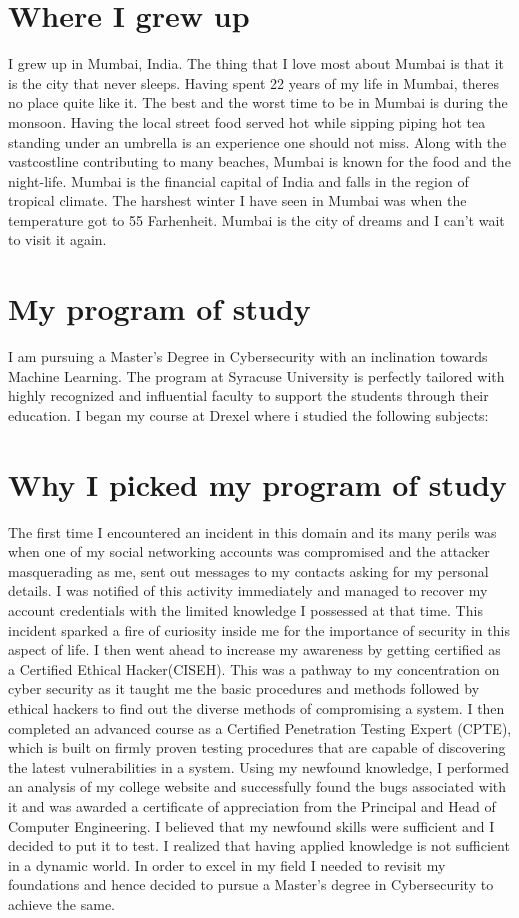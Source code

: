 \documentclass[11]{article}
\begin{document}
\newpage
\section{Where I grew up}
I grew up in Mumbai, India. The thing that I love most about Mumbai is that it is the city that never sleeps. Having spent 22 years of my life in Mumbai, theres no place quite like it. The best and the worst time to be in Mumbai is during the monsoon. Having the local street food served hot while sipping piping hot tea standing under an umbrella is an experience one should not miss. Along with the vastcostline contributing to many beaches, Mumbai is known for the food and the night-life.
Mumbai is the financial capital of India and falls in the region of tropical climate. The harshest winter I have seen in Mumbai was when the temperature got to 55 Farhenheit. 
Mumbai is the city of dreams and I can't wait to visit it again.


\section{My program of study}
I am pursuing a Master's Degree in Cybersecurity with an inclination towards Machine Learning. The program at Syracuse University is perfectly tailored with highly recognized and influential faculty to support the students through their education.
I began my course at Drexel where i studied the following subjects:



\section{Why I picked my program of study}
The first time I encountered an incident in this domain and its many perils was when one of
my social networking accounts was compromised and the attacker masquerading as me,
sent out messages to my contacts asking for my personal details. I was notified of this
activity immediately and managed to recover my account credentials with the limited
knowledge I possessed at that time. This incident sparked a fire of curiosity inside me for the
importance of security in this aspect of life. I then went ahead to increase my awareness by
getting certified as a Certified Ethical Hacker(CISEH). This was a pathway to my
concentration on cyber security as it taught me the basic procedures and methods followed
by ethical hackers to find out the diverse methods of compromising a system. I then
completed an advanced course as a Certified Penetration Testing Expert (CPTE), which is
built on firmly proven testing procedures that are capable of discovering the latest
vulnerabilities in a system. Using my newfound knowledge, I performed an analysis of my
college website and successfully found the bugs associated with it and was awarded a
certificate of appreciation from the Principal and Head of Computer Engineering.
I believed that my newfound skills were sufficient and I decided to put it to test. I realized that having applied knowledge is not sufficient in a dynamic world. In order to excel in my field I needed to revisit my foundations and hence decided to pursue a Master's degree in Cybersecurity to achieve the same.
\end{document}
